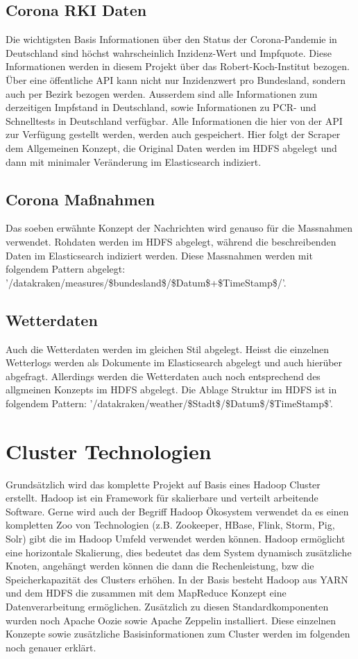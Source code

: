 \documentclass[12pt,oneside,a4paper,parskip]{scrbook}
\begin{document}
\section{Corona RKI Daten}
Die wichtigsten Basis Informationen \"uber den Status der Corona-Pandemie in Deutschland sind h\"ochst wahrscheinlich Inzidenz-Wert und Impfquote. Diese Informationen werden in diesem Projekt \"uber das Robert-Koch-Institut bezogen. \"Uber eine \"offentliche API kann nicht nur Inzidenzwert pro Bundesland, sondern auch per Bezirk bezogen werden. Ausserdem sind alle Informationen zum derzeitigen Impfstand in Deutschland, sowie Informationen zu PCR- und Schnelltests in Deutschland verf\"ugbar. Alle Informationen die hier von der API zur Verf\"ugung gestellt werden, werden auch gespeichert. Hier folgt der Scraper dem Allgemeinen Konzept, die Original Daten werden im HDFS abgelegt und dann mit minimaler Ver\"anderung im Elasticsearch indiziert.

\section{Corona Maßnahmen}
Das soeben erw\"ahnte Konzept der Nachrichten wird genauso f\"ur die Massnahmen verwendet. Rohdaten werden im HDFS abgelegt, w\"ahrend die beschreibenden Daten im Elasticsearch indiziert werden. Diese Massnahmen werden mit folgendem Pattern abgelegt: '/datakraken/measures/\$bundesland\$/\$Datum\$+\$TimeStamp\$/'.

\section{Wetterdaten}
Auch die Wetterdaten werden im gleichen Stil abgelegt. Heisst die einzelnen Wetterlogs werden als Dokumente im Elasticsearch abgelegt und auch hier\"uber abgefragt. Allerdings werden die Wetterdaten auch noch entsprechend des allgmeinen Konzepts im HDFS abgelegt. Die Ablage Struktur im HDFS ist in folgendem Pattern:  '/datakraken/weather/\$Stadt\$/\$Datum\$/\$TimeStamp\$'.
\chapter{Cluster Technologien}
Grunds\"atzlich wird das komplette Projekt auf Basis eines Hadoop Cluster erstellt. Hadoop ist ein Framework f\"ur skalierbare und verteilt arbeitende Software. Gerne wird auch der Begriff  Hadoop \"Okosystem verwendet da es einen kompletten Zoo von Technologien (z.B. Zookeeper, HBase, Flink, Storm, Pig, Solr) gibt die im Hadoop Umfeld verwendet werden k\"onnen. Hadoop erm\"oglicht eine horizontale Skalierung, dies bedeutet das dem System dynamisch zus\"atzliche Knoten, angeh\"angt werden k\"onnen die dann die Rechenleistung, bzw die Speicherkapazit\"at des Clusters erh\"ohen. In der Basis besteht Hadoop aus YARN und dem HDFS die zusammen mit dem MapReduce Konzept eine Datenverarbeitung erm\"oglichen. Zus\"atzlich zu diesen Standardkomponenten wurden noch Apache Oozie sowie Apache Zeppelin installiert. Diese einzelnen Konzepte sowie zus\"atzliche Basisinformationen zum Cluster werden im folgenden noch genauer erkl\"art.
\end{document}
